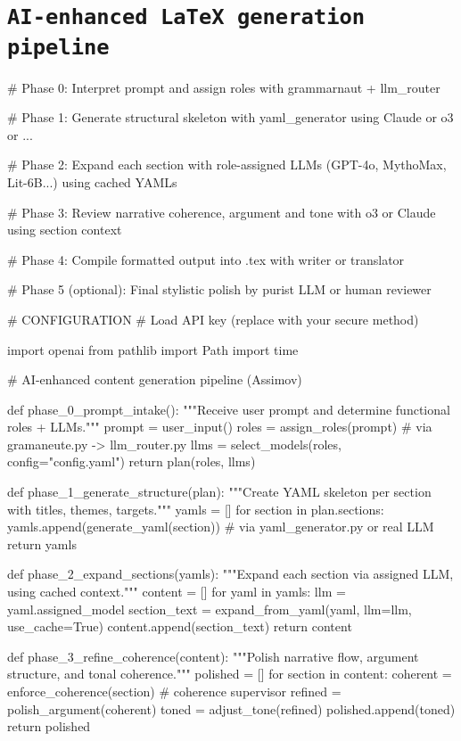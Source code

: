 \documentclass[12pt,a4paper]{article}
\begin{document}
				
			
			
			\section*{\texttt{AI-enhanced LaTeX generation pipeline}}
			
			\begin{metaoutput}
# Phase 0: Interpret prompt and assign roles with grammarnaut + llm_router

# Phase 1: Generate structural skeleton with yaml_generator using Claude or o3 or ...

# Phase 2: Expand each section with role-assigned LLMs (GPT-4o, MythoMax, Lit-6B...) using cached YAMLs

# Phase 3: Review narrative coherence, argument and tone with o3 or Claude using section context

# Phase 4: Compile formatted output into .tex with writer or translator

# Phase 5 (optional): Final stylistic polish by purist LLM or human reviewer

# CONFIGURATION
# Load API key (replace with your secure method)

import openai
from pathlib import Path
import time

				
# AI-enhanced content generation pipeline (Assimov)

def phase_0_prompt_intake():
    """Receive user prompt and determine functional roles + LLMs."""
    prompt = user_input()
    roles = assign_roles(prompt)  # via gramaneute.py -> llm_router.py
    llms = select_models(roles, config="config.yaml")
    return plan(roles, llms)

def phase_1_generate_structure(plan):
    """Create YAML skeleton per section with titles, themes, targets."""
    yamls = []
    for section in plan.sections:
    yamls.append(generate_yaml(section))  # via yaml_generator.py or real LLM
    return yamls

def phase_2_expand_sections(yamls):
    """Expand each section via assigned LLM, using cached context."""
    content = []
    for yaml in yamls:
        llm = yaml.assigned_model
        section_text = expand_from_yaml(yaml, llm=llm, use_cache=True)
        content.append(section_text)
    return content

def phase_3_refine_coherence(content):
    """Polish narrative flow, argument structure, and tonal coherence."""
    polished = []
    for section in content:
        coherent = enforce_coherence(section)  # coherence supervisor
        refined = polish_argument(coherent)
        toned = adjust_tone(refined)
        polished.append(toned)
    return polished


\end{metaoutput}
\end{document}
